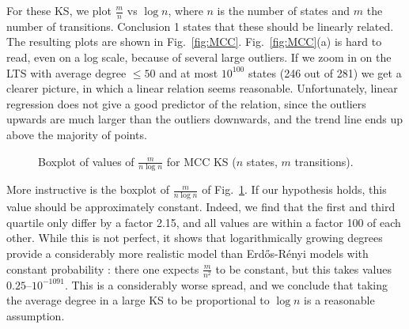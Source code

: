 \documentclass[runngingheads]{llncs}
\begin{document}
For these KS, we plot $\tfrac{m}{n}$ vs $\log n$, where $n$ is the number of states and $m$ the number of transitions. Conclusion 1 states that these should be linearly related. The resulting plots are shown in Fig.~\ref{fig:MCC}. Fig.~\ref{fig:MCC}(a) is hard to read, even on a log scale, because of several large outliers. If we zoom in on the LTS with average degree $\leq 50$ and at most $10^{100}$ states (246 out of 281) we get a clearer picture, in which a linear relation seems reasonable. Unfortunately, linear regression does not give a good predictor of the relation, since the outliers upwards are much larger than the outliers downwards, and the trend line ends up above the majority of points.

\begin{figure}
\centering
 \vspace{-3em}
\caption{Boxplot of values of $\frac{m}{n\log n}$ for MCC KS ($n$ states, $m$ transitions).} \label{fig:boxplot}
\end{figure}
More instructive is the boxplot of $\tfrac{m}{n \log n}$ of Fig.~\ref{fig:boxplot}. If our hypothesis holds, this value should be approximately constant. Indeed, we find that the first and third quartile only differ by a factor 2.15, and all values are within a factor 100 of each other. While this is not perfect, it shows that logarithmically growing degrees provide a considerably more realistic model than Erd\H{o}s-Rényi models with constant probability \cite{dong20250}: there one expects $\tfrac{m}{n^2}$ to be constant, but this takes values $0.25$--$10^{-1091}$. This is a considerably worse spread, and we conclude that taking the average degree in a large KS to be proportional to $\log n$ is a reasonable assumption.
\end{document}

